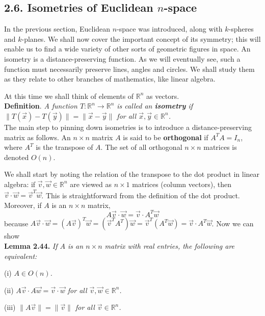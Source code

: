 \documentclass[leqno]{book}
\begin{document}
\subsection*{2.6. Isometries of Euclidean $n$-space}
In the previous section, Euclidean $n$-space was introduced, along with $k$-spheres and $k$-planes.  We shall now cover the important concept of its symmetry; this will enable us to find a wide variety of other sorts of geometric figures in space.  An isometry is a distance-preserving function.  As we will eventually see, such a function must necessarily preserve lines, angles and circles.  We shall study them as they relate to other branches of mathematics, like linear algebra.

At this time we shall think of elements of $\mathbb R^n$ as vectors.\\

\noindent\textbf{Definition}. \emph{A function $T:\mathbb R^n\to\mathbb R^n$ is called an \textbf{isometry} if $\|T(\vec x)-T(\vec y)\|=\|\vec x-\vec y\|$ for all $\vec x,\vec y\in\mathbb R^n$.}\\ %

\noindent The main step to pinning down isometries is to introduce a distance-preserving matrix as follows. An $n\times n$ matrix $A$ is said to be \textbf{orthogonal} if $A^TA=I_n$, where $A^T$ is the transpose of $A$.  The set of all orthogonal $n\times n$ matrices is denoted $O(n)$.

We shall start by noting the relation of the transpose to the dot product in linear algebra: if $\vec v,\vec w\in\mathbb R^n$ are viewed as $n\times 1$ matrices (column vectors), then $\vec v\cdot\vec w=\vec v^T\vec w$.  This is straightforward from the definition of the dot product.  Moreover, if $A$ is an $n\times n$ matrix,
$$A\vec v\cdot\vec w=\vec v\cdot A^T\vec w$$
because $A\vec v\cdot\vec w=(A\vec v)^T\vec w=(\vec v^TA^T)\vec w=\vec v^T(A^T\vec w)=\vec v\cdot A^T\vec w$.  Now we can show\\

\noindent\textbf{Lemma 2.44.} \emph{If $A$ is an $n\times n$ matrix with real entries, the following are equivalent:}

(i) \emph{$A\in O(n)$.}

(ii) \emph{$A\vec v\cdot A\vec w=\vec v\cdot\vec w$ for all $\vec v,\vec w\in\mathbb R^n$.}

(iii) \emph{$\|A\vec v\|=\|\vec v\|$ for all $\vec v\in\mathbb R^n$.}
\end{document}
